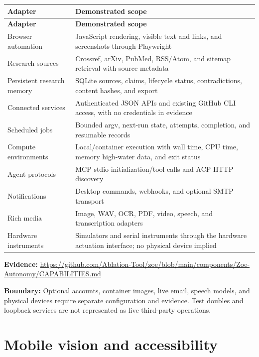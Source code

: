\documentclass[11pt]{article}
\newcommand{\boundary}[1]{\par\smallskip\small\color{ZoeGray}\textbf{Boundary:} #1\normalsize\par\smallskip}
\newcommand{\evidence}[1]{\par\smallskip\small\color{ZoeGray}\textbf{Evidence:} #1\normalsize\par\smallskip}
\begin{document}
\begin{longtable}{p{}p{}}
\toprule
\textbf{Adapter} & \textbf{Demonstrated scope}\\
\midrule
\endfirsthead
\toprule
\textbf{Adapter} & \textbf{Demonstrated scope}\\
\midrule
\endhead
Browser automation & JavaScript rendering, visible text and links, and screenshots through Playwright\\
Research sources & Crossref, arXiv, PubMed, RSS/Atom, and sitemap retrieval with source metadata\\
Persistent research memory & SQLite sources, claims, lifecycle status, contradictions, content hashes, and export\\
Connected services & Authenticated JSON APIs and existing GitHub CLI access, with no credentials in evidence\\
Scheduled jobs & Bounded argv, next-run state, attempts, completion, and resumable records\\
Compute environments & Local/container execution with wall time, CPU time, memory high-water data, and exit status\\
Agent protocols & MCP stdio initialization/tool calls and ACP HTTP discovery\\
Notifications & Desktop commands, webhooks, and optional SMTP transport\\
Rich media & Image, WAV, OCR, PDF, video, speech, and transcription adapters\\
Hardware instruments & Simulators and serial instruments through the hardware actuation interface; no physical device implied\\
\bottomrule
\end{longtable}

\evidence{\url{https://github.com/Ablation-Tool/zoe/blob/main/components/Zoe-Autonomy/CAPABILITIES.md}}
\boundary{Optional accounts, container images, live email, speech models, and physical devices require separate configuration and evidence. Test doubles and loopback services are not represented as live third-party operations.}

\clearpage
\section{Mobile vision and accessibility}
\end{document}

